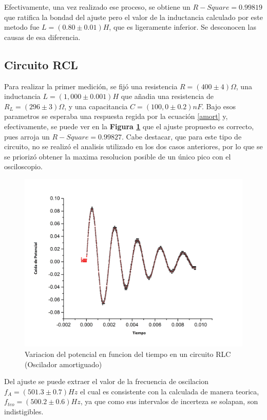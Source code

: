 \documentclass[11pt,a4paper]{article}
\begin{document}
Efectivamente, una vez realizado ese proceso, se obtiene un $R-Square = 0.99819$ que ratifica la bondad del ajuste pero el valor de la inductancia calculado por este metodo fue $L = (0.80 \pm 0.01) H$, que es ligeramente inferior. Se desconocen las causas de esa diferencia.


\subsection{Circuito RCL}

Para realizar la primer medición, se fijó una resistencia $R= (400 \pm 4) \Omega$, una inductancia $L = (1,000 \pm 0.001) H$ que añadia una resistencia de $R_{L} = (296 \pm 3) \Omega$, y una capacitancia $C = (100,0 \pm 0.2) nF$. Bajo esos parametros se esperaba una respuesta regida por la ecuación \eqref{amort} y, efectivamente, se puede ver en la \textbf{Figura \ref{fig:RLC-A}} que el ajuste propuesto es correcto, pues arroja un $R-Square = 0.99827$. Cabe destacar, que para este tipo de circuito, no se realizó el analisis utilizado en los dos casos anteriores, por lo que se se priorizó obtener la maxima resolucion posible de un único pico con el osciloscopio.

\begin{figure}[H]
\centering
\includegraphics[scale=0.4]{RLC-Amortiguado(1H)}
  \caption{Variacion del potencial en funcion del tiempo en un circuito RLC (Oscilador amortiguado)}
  \label{fig:RLC-A}
\end{figure}

Del ajuste se puede extraer el valor de la frecuencia de oscilacion $f_{A} = (501.3 \pm 0.7) Hz$ el cual es consistente con la calculada de manera teorica, $f_{teo} = (500.2 \pm 0.6)Hz$, ya que como sus intervalos de incerteza se solapan, son indistigibles.
\end{document}
